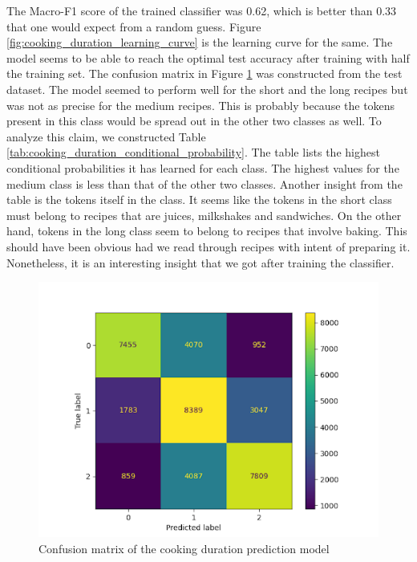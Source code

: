 \documentclass[sigconf]{acmart}
\begin{document}
The Macro-F1 score of the trained classifier was 0.62, which is better than 0.33 that one would expect from a random guess. Figure \ref{fig:cooking_duration_learning_curve} is the learning curve for the same. The model seems to be able to reach the optimal test accuracy after training with half the training set. The confusion matrix in Figure \ref{fig:cooking_duration_confusion_matrix} was constructed from the test dataset. The model seemed to perform well for the short and the long recipes but was not as precise for the medium recipes. This is probably because the tokens present in this class would be spread out in the other two classes as well. To analyze this claim, we constructed Table \ref{tab:cooking_duration_conditional_probability}. The table lists the highest conditional probabilities it has learned for each class. The highest values for the medium class is less than that of the other two classes. Another insight from the table is the tokens itself in the class. It seems like the tokens in the short class must belong to recipes that are juices, milkshakes and sandwiches. On the other hand, tokens in the long class seem to belong to recipes that involve baking. This should have been obvious had we read through recipes with intent of preparing it. Nonetheless, it is an interesting insight that we got after training the classifier.

\begin{figure}[h]
    \centering
    \includegraphics[width=\linewidth]{cooking_duration_confusion_matrix.png}
    \caption{Confusion matrix of the cooking duration prediction model}
    \label{fig:cooking_duration_confusion_matrix}
\end{figure}
\end{document}
